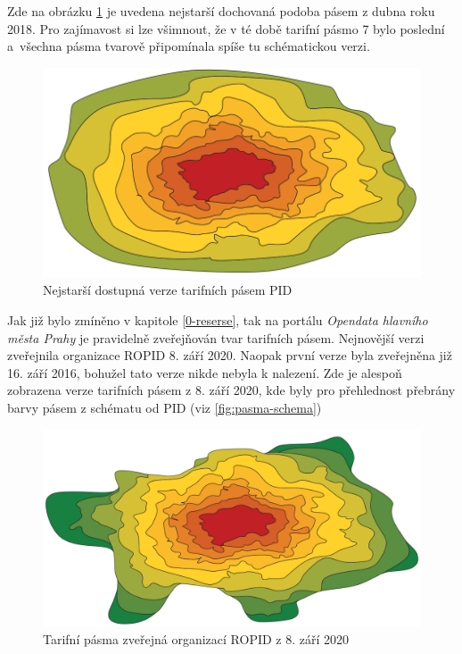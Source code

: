 Zde na obrázku \ref{fig:pasma-nejstarsi} je uvedena nejstarší dochovaná podoba pásem z dubna roku 2018.
Pro zajímavost si lze všimnout, že v té době tarifní pásmo 7 bylo poslední a~všechna pásma tvarově připomínala
spíše tu schématickou verzi.

\begin{figure}[H] \centering
    \includegraphics[width=350pt]{./pictures/pasma-nejstarsi.png}
    \caption[Nejstarší dostupná verze tarifních pásem PID]{Nejstarší dostupná verze tarifních pásem PID}
	\label{fig:pasma-nejstarsi}                                
\end{figure}

Jak již bylo zmíněno v kapitole \ref{0-reserse}, tak na portálu \textit{Opendata hlavního města Prahy}
je pravidelně zveřejňován tvar tarifních pásem. Nejnovější verzi zveřejnila organizace ROPID 8. září 2020.
Naopak první verze byla zveřejněna již 16. září 2016, bohužel tato verze nikde nebyla k nalezení.
Zde je alespoň zobrazena verze tarifních pásem z 8. září 2020, kde byly pro přehlednost 
přebrány barvy pásem z schématu od PID (viz \ref{fig:pasma-schema})

\begin{figure}[H] \centering
    \includegraphics[width=400pt]{./pictures/pasma-ROPID.png}
    \caption[Tarifní pásma zveřejná organizací ROPID z 8. září 2020]{Tarifní pásma zveřejná organizací ROPID z 8. září 2020}
	\label{fig:pasma-ROPID}                                
\end{figure}


